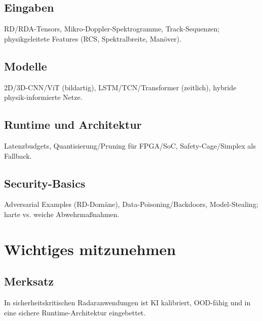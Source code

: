 \section{Eingaben}
RD/RDA-Tensors, Mikro-Doppler-Spektrogramme, Track-Sequenzen; 
physikgeleitete Features (RCS, Spektralbreite, Manöver).

\section{Modelle}
2D/3D-CNN/ViT (bildartig), LSTM/TCN/Transformer (zeitlich), hybride physik-informierte Netze.

\section{Runtime und Architektur}
Latenzbudgets, Quantisierung/Pruning für FPGA/SoC, Safety-Cage/Simplex als Fallback.

\section{Security-Basics}
Adversarial Examples (RD-Domäne), Data-Poisoning/Backdoors, Model-Stealing; 
harte vs. weiche Abwehrmaßnahmen.




\chapter{Wichtiges mitzunehmen}
\section{Merksatz}
In sicherheitskritischen Radaranwendungen ist KI kalibriert, OOD-fähig und in eine sichere Runtime-Architektur eingebettet.